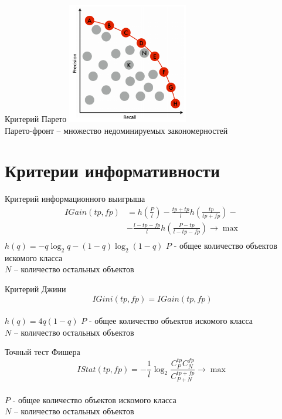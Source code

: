 \documentclass[10pt]{beamer}
\begin{document}
\begin{frame}{Критерий Парето}
  \centering
  \includegraphics[height=150pt, keepaspectratio = true]{images/pareto}   \\
  Парето-фронт -- множество недоминируемых закономерностей
\end{frame}

\section{Критерии информативности}

\begin{frame}{Критерий информационного выигрыша}
  \begin{align*} 
		IGain(tp,fp) &= h(\frac{P}{l}) - \frac{tp+tp}{l}h(\frac{tp}{tp+fp}) - \\
		&- \frac{l-tp-fp}{l}h(\frac{P-tp}{l-tp-fp}) \rightarrow \max \\
	\end{align*} 
	$h(q) = -q\log_2q - (1-q)\log_2(1-q)$
	\bigbreak	
	$P$ - общее количество объектов искомого класса\\
	$N$ -- количество остальных объектов
\end{frame}

\begin{frame}{Критерий Джини}
	$$IGini(tp,fp)=IGain(tp,fp) $$\\
	\bigbreak
	$h(q)=4q(1-q)$
	\bigbreak
	$P$ - общее количество объектов искомого класса\\
	$N$ -- количество остальных объектов
\end{frame}

{
\begin{frame}{Точный тест Фишера}
	$$IStat(tp,fp) = -\frac{1}{l}\log_2\frac{C_P^{tp}C_N^{fp}}{C_{P+N}^{tp+fp}} \rightarrow \max$$\\
	\bigbreak
	$P$ - общее количество объектов искомого класса\\
	$N$ -- количество остальных объектов
\end{frame}
}
\end{document}
